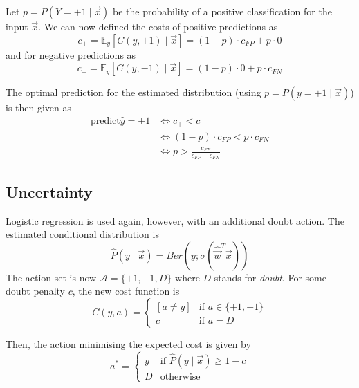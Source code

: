 Let $p = P(Y = +1 \mid \vec{x})$ be the
probability of a positive classification
for the input $\vec{x}$.
We can now defined the costs of positive
predictions as
\begin{equation*}
    c_+ = \mathbb{E}_y[C(y, +1) \mid \vec{x}]
    = (1 - p) \cdot c_{FP} + p \cdot 0
\end{equation*}
and for negative predictions as
\begin{equation*}
    c_- = \mathbb{E}_y[C(y, -1) \mid \vec{x}]
    = (1 - p) \cdot 0 + p \cdot c_{FN}
\end{equation*}

The optimal prediction for the estimated
distribution 
(using $p = P(y = +1 \mid \vec{x})$)
is then given as
\begin{align*}
    \text{predict} \hat{y} = +1
    &\Leftrightarrow c_+ < c_- \\
    &\Leftrightarrow (1-p) \cdot c_{FP} < p \cdot c_{FN} \\
    &\Leftrightarrow p > \frac{c_{FP}}{c_{FP} + c_{FN}}
\end{align*}


\subsection{Uncertainty}
Logistic regression is used again,
however, with an additional doubt action.
The estimated conditional distribution is
\begin{equation*}
    \hat{P}(y \mid \vec{x}) =
    Ber(y ; \sigma(\hat{\vec{w}}^T \vec{x}))
\end{equation*}
The action set is now
$\mathcal{A} = \{+1, -1, D\}$
where $D$ stands for \emph{doubt}.
For some doubt penalty $c$, the
new cost function is
\begin{equation*}
    C(y, a) =
    \begin{cases}
        [a \neq y] & \text{if $a \in \{+1, -1\}$} \\
        c & \text{if $a = D$}
    \end{cases}
\end{equation*}

Then, the action minimising the expected
cost is given by
\begin{equation*}
    a^* = \begin{cases}
        y & \text{if $\hat{P}(y \mid \vec{x}) \geq 1 - c$} \\
        D & \text{otherwise}
    \end{cases}
\end{equation*}


